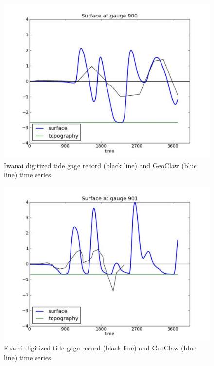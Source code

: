 \begin{figure}[ht]
\hfil\includegraphics[width=5.0in]{bp9/Iwanai.pdf}\hfil
\caption{\label{Iwanai}
Iwanai digitized tide gage record (black line) and GeoClaw (blue line) time series. 
  }
\end{figure}

\begin{figure}[ht]
\hfil\includegraphics[width=5.0in]{bp9/Esashi.pdf}\hfil
\caption{\label{Esashi}
Esashi digitized tide gage record (black line) and GeoClaw (blue line) time series. 
  }
\end{figure}



